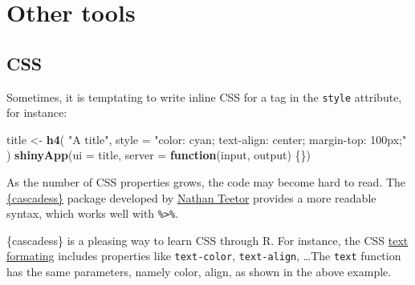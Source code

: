 \documentclass[
]{book}
\newenvironment{Shaded}{\begin{snugshade}}{\end{snugshade}}
\newcommand{\ControlFlowTok}[1]{\textcolor[rgb]{0.13,0.29,0.53}{\textbf{#1}}}
\newcommand{\DataTypeTok}[1]{\textcolor[rgb]{0.13,0.29,0.53}{#1}}
\newcommand{\DecValTok}[1]{\textcolor[rgb]{0.00,0.00,0.81}{#1}}
\newcommand{\KeywordTok}[1]{\textcolor[rgb]{0.13,0.29,0.53}{\textbf{#1}}}
\newcommand{\NormalTok}[1]{#1}
\newcommand{\OperatorTok}[1]{\textcolor[rgb]{0.81,0.36,0.00}{\textbf{#1}}}
\newcommand{\StringTok}[1]{\textcolor[rgb]{0.31,0.60,0.02}{#1}}
\begin{document}
\hypertarget{htmltools-other-tools}{%
\chapter{Other tools}\label{htmltools-other-tools}}

\hypertarget{css}{%
\section{CSS}\label{css}}

Sometimes, it is temptating to write inline CSS for a tag in the \texttt{style} attribute, for instance:

\begin{Shaded}
\begin{Highlighting}[]
\NormalTok{title <-}\StringTok{ }\KeywordTok{h4}\NormalTok{(}
  \StringTok{"A title"}\NormalTok{,}
  \DataTypeTok{style =} \StringTok{"color: cyan; text-align: center; margin-top: 100px;"}
\NormalTok{)}
\KeywordTok{shinyApp}\NormalTok{(}\DataTypeTok{ui =}\NormalTok{ title, }\DataTypeTok{server =} \ControlFlowTok{function}\NormalTok{(input, output) \{\})}
\end{Highlighting}
\end{Shaded}

As the number of CSS properties grows, the code may become hard to read. The \href{https://github.com/nteetor/cascadess}{\{cascadess\}} package developed by \href{}{Nathan Teetor} provides a more readable syntax, which works well with \texttt{\%\textgreater{}\%}.

\begin{Shaded}
\end{Shaded}

\{cascadess\} is a pleasing way to learn CSS through R. For instance, the CSS \href{https://www.google.com/search?client=safari\&rls=en\&q=text+properties+css\&ie=UTF-8\&oe=UTF-8}{text formating} includes properties like \texttt{text-color}, \texttt{text-align}, \ldots The \texttt{text} function has the same parameters, namely color, align, as shown in the above example.
\end{document}
